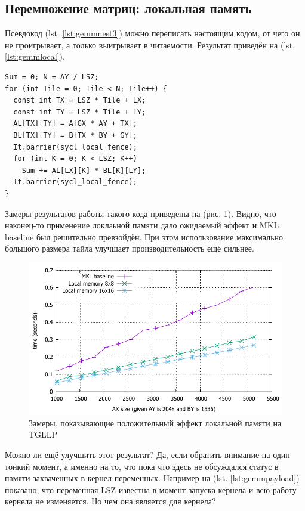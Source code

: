 \documentclass[a4paper,12pt,oneside]{article}
\begin{document}
\subsection{Перемножение матриц: локальная память}\label{subsec:gemmlocal}

Псевдокод (lst. \ref{lst:gemmnest3}) можно переписать настоящим кодом, от чего он не проигрывает, а только выигрывает в  читаемости.
Результат приведён на (lst. \ref{lst:gemmlocal}).

\begin{lstlisting}[caption={Перемножение матриц в локальной памяти},label={lst:gemmlocal}]
Sum = 0; N = AY / LSZ;
for (int Tile = 0; Tile < N; Tile++) {
  const int TX = LSZ * Tile + LX;
  const int TY = LSZ * Tile + LY;
  AL[TX][TY] = A[GX * AY + TX];
  BL[TX][TY] = B[TX * BY + GY];
  It.barrier(sycl_local_fence);
  for (int K = 0; K < LSZ; K++)
    Sum += AL[LX][K] * BL[K][LY];
  It.barrier(sycl_local_fence);
}
\end{lstlisting}

Замеры результатов работы такого кода приведены на (рис. \ref{fig:sgemm_lsz}).
Видно, что наконец-то применение локлаьной памяти дало ожидаемый эффект и MKL baseline был решительно превзойдён.
При этом использование максимально большого размера тайла улучшает производительность ещё сильнее.

\begin{figure}
\centering
\includegraphics[width=1.0\textwidth]{pictures/sgemm_lsz.pdf}
\caption{Замеры, показывающие положительный эффект локальной памяти на TGLLP}
\label{fig:sgemm_lsz}
\end{figure}

Можно ли ещё улучшить этот результат?
Да, если обратить внимание на один тонкий момент, а именно на то, что пока что здесь не обсуждался статус в памяти захваченных в кернел переменных.
Например на (lst. \ref{lst:gemmpayload}) показано, что переменная LSZ известна в момент запуска кернела и всю работу кернела не изменяется.
Но чем она является для кернела?
\end{document}

